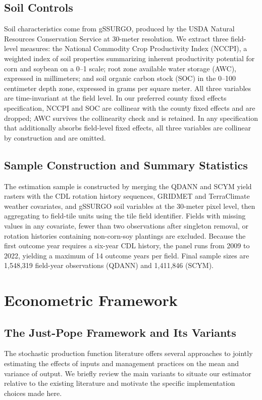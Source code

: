 \documentclass[11pt,letterpaper]{article}
\theoremstyle{remark}
\theoremstyle{plain}
\theoremstyle{definition}
\begin{document}
\subsection{\label{subsec:soil_controls}Soil Controls}
Soil characteristics come from gSSURGO, produced by the USDA Natural Resources Conservation Service at 30-meter resolution. We extract three field-level measures: the National Commodity Crop Productivity Index (NCCPI), a weighted index of soil properties summarizing inherent productivity potential for corn and soybean on a 0–1 scale; root zone available water storage (AWC), expressed in millimeters; and soil organic carbon stock (SOC) in the 0–100 centimeter depth zone, expressed in grams per square meter. All three variables are time-invariant at the field level. In our preferred county fixed effects specification, NCCPI and SOC are collinear with the county fixed effects and are dropped; AWC survives the collinearity check and is retained. In any specification that additionally absorbs field-level fixed effects, all three variables are collinear by construction and are omitted.

\subsection{\label{subsec:smaple_const}Sample Construction and Summary Statistics}
The estimation sample is constructed by merging the QDANN and SCYM yield rasters with the CDL rotation history sequences, GRIDMET and TerraClimate weather covariates, and gSSURGO soil variables at the 30-meter pixel level, then aggregating to field-tile
units using the tile field identifier. Fields with missing values in any covariate, fewer than two observations after singleton removal, or rotation histories containing non-corn-soy plantings are excluded. Because the first outcome year requires a six-year CDL history, the panel runs from 2009 to 2022, yielding a maximum of 14 outcome years per field. Final sample sizes are 1,548,319 field-year observations (QDANN) and 1,411,846 (SCYM).
	
\section{Econometric Framework\label{sec:econ_framework}}
\subsection{\label{subsec:just_pope}The Just-Pope Framework and Its Variants}
The stochastic production function literature offers several approaches to jointly estimating the effects of inputs and management practices on the mean and variance of output. We briefly review the main variants to situate our estimator relative to the existing literature and motivate the specific implementation choices made here.
\end{document}
